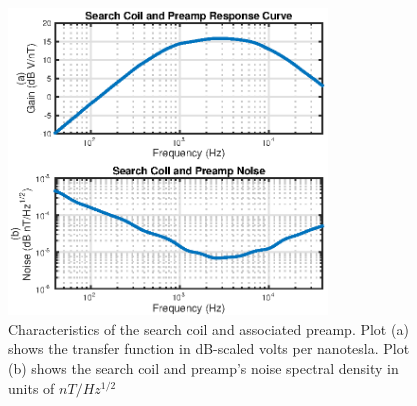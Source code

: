 \begin{figure}[t]
\begin{center}
\includegraphics[width=20pc]{figures/vpm_figures/searchcoil_response_2up.eps}
\caption[Characteristics of the search coil and associated preamp]{Characteristics of the search coil and associated preamp. Plot (a) shows the transfer function in dB-scaled volts per nanotesla. Plot (b) shows the search coil and preamp's noise spectral density in units of $nT/Hz^{1/2}$}
\label{fig:searchcoil}
\end{center}
\end{figure}


